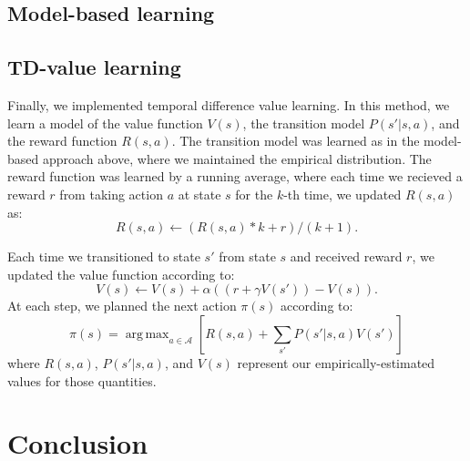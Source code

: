 \documentclass[11pt]{amsart}
\DeclareMathOperator*{\argmax}{arg\,max}
\begin{document}
\subsection{Model-based learning}

\subsection{TD-value learning}

Finally, we implemented temporal difference value learning. In this method, we learn a model of the value function $V(s)$, the transition model $P(s'|s,a)$, and the reward function $R(s,a)$. The transition model was learned as in the model-based approach above, where we maintained the empirical distribution. The reward function was learned by a running average, where each time we recieved a reward $r$ from taking action $a$ at state $s$ for the $k$-th time, we updated $R(s,a)$ as:
$$R(s,a) \gets (R(s,a) * k + r)/(k + 1).$$

Each time we transitioned to state $s'$ from state $s$ and received reward $r$, we updated the value function according to:
$$V(s) \gets V(s) + \alpha ((r + \gamma V(s')) - V(s)).$$
At each step, we planned the next action $\pi(s)$ according to:
$$\pi(s) = \argmax_{a \in \mathcal{A}} \left[ R(s,a) + \sum_{s'} P(s'|s,a) V(s') \right]$$
where $R(s,a)$, $P(s'|s,a)$, and $V(s)$ represent our empirically-estimated values for those quantities.

\section{Conclusion}


\begingroup
\begin{thebibliography}{9}


\end{thebibliography}
\endgroup
\end{document}
